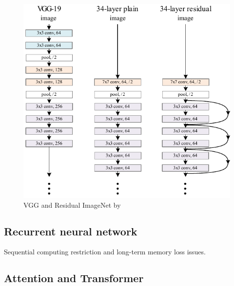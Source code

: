 \hspace{1em}
\begin{minipage}[ht]{.62\textwidth}
    \begin{figure}[H]
        \centering
    \includegraphics[width=.99\textwidth]{literature/imgs/ext-CNN-ResNet.pdf}
    \caption{VGG and Residual ImageNet by \citet{he2015deep}}
    \label{fig:ext-CNN-ResNet}
    \end{figure}
\end{minipage}

\subsection{Recurrent neural network} %
\citet{jordan1997serial}

\citet{hochreiter1997long}

\citet{sherstinsky2020fundamentals}

\citet{chung2014empirical}

Sequential computing restriction and long-term memory loss issues.

\subsection{Attention and Transformer} %
\citet{bahdanau2016neural}

